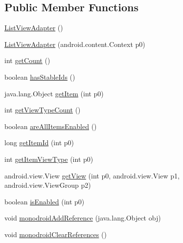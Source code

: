 \subsection*{Public Member Functions}
\begin{CompactItemize}
\item 
\hyperlink{classmd5b60ffeb829f638581ab2bb9b1a7f4f3f_1_1_list_view_adapter_496143b32749f9b0cf67e05789c7aba6}{ListViewAdapter} ()
\item 
\hyperlink{classmd5b60ffeb829f638581ab2bb9b1a7f4f3f_1_1_list_view_adapter_05870e24bde7dafbf3a32f91e03545d9}{ListViewAdapter} (android.content.Context p0)
\item 
int \hyperlink{classmd5b60ffeb829f638581ab2bb9b1a7f4f3f_1_1_list_view_adapter_9f24848499759eacb32669883ca93995}{getCount} ()
\item 
boolean \hyperlink{classmd5b60ffeb829f638581ab2bb9b1a7f4f3f_1_1_list_view_adapter_f602626fd68dbd7b7b5f21f077d0a303}{hasStableIds} ()
\item 
java.lang.Object \hyperlink{classmd5b60ffeb829f638581ab2bb9b1a7f4f3f_1_1_list_view_adapter_73d2d62a8f9f049e63781a1a8f96b232}{getItem} (int p0)
\item 
int \hyperlink{classmd5b60ffeb829f638581ab2bb9b1a7f4f3f_1_1_list_view_adapter_d3f6189cd42d626e244ac54ad5afdc10}{getViewTypeCount} ()
\item 
boolean \hyperlink{classmd5b60ffeb829f638581ab2bb9b1a7f4f3f_1_1_list_view_adapter_2c591a49427e11f184e70d0db0678c5d}{areAllItemsEnabled} ()
\item 
long \hyperlink{classmd5b60ffeb829f638581ab2bb9b1a7f4f3f_1_1_list_view_adapter_9bf248f34b601de71eb45468af4d5230}{getItemId} (int p0)
\item 
int \hyperlink{classmd5b60ffeb829f638581ab2bb9b1a7f4f3f_1_1_list_view_adapter_c49d0d79db395817151bc8bb649e6a4f}{getItemViewType} (int p0)
\item 
android.view.View \hyperlink{classmd5b60ffeb829f638581ab2bb9b1a7f4f3f_1_1_list_view_adapter_e2fe00b727ac49a6127f035217453806}{getView} (int p0, android.view.View p1, android.view.ViewGroup p2)
\item 
boolean \hyperlink{classmd5b60ffeb829f638581ab2bb9b1a7f4f3f_1_1_list_view_adapter_15dc86c11acd1d564985b671571b2d78}{isEnabled} (int p0)
\item 
void \hyperlink{classmd5b60ffeb829f638581ab2bb9b1a7f4f3f_1_1_list_view_adapter_1325a463fbf8e693412780668a9e9a7e}{monodroidAddReference} (java.lang.Object obj)
\item 
void \hyperlink{classmd5b60ffeb829f638581ab2bb9b1a7f4f3f_1_1_list_view_adapter_92941f5776f2c562a319f8c0cce9f2a4}{monodroidClearReferences} ()
\end{CompactItemize}
